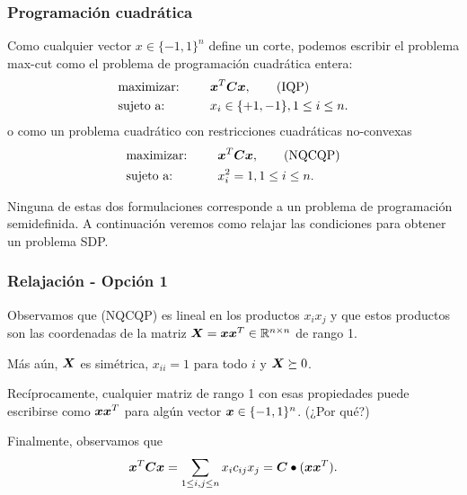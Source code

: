 \documentclass[aspectratio=169,12pt,spanish]{beamer}
\begin{document}

\begin{frame}
\frametitle{Programación cuadrática}

Como cualquier vector $x \in \{-1, 1\}^n$ define un corte, podemos escribir el problema max-cut como el problema de programación cuadrática entera:
\begin{alignat*}{2}
  & \text{maximizar: } & \quad & \bm{x}^T \bm{C} \bm{x}, \tag{IQP}\label{IQP} \\
  & \text{sujeto a: } & \quad & x_i \in \{+1, -1\}, 1 \le i \le n.
\end{alignat*}
o como un problema cuadrático con restricciones cuadráticas no-convexas
\begin{alignat*}{2}
  & \text{maximizar: } & \quad & \bm{x}^T \bm{C} \bm{x}, \tag{NQCQP}\label{NQCQP}\\
  & \text{sujeto a: } & \quad & x_i^2 = 1, 1 \le i \le n.
\end{alignat*}

Ninguna de estas dos formulaciones corresponde a un problema de programación semidefinida. A continuación veremos como relajar las condiciones para obtener un problema SDP.


\end{frame}


\begin{frame}
\frametitle{Relajación - Opción 1}

Observamos que (NQCQP) es lineal en los productos $x_i x_j$ y que estos productos son las coordenadas de la matriz $\bm{X} = \bm{x}\bm{x}^T \in \mathbb{R}^{n \times n}$ de rango 1.

Más aún, $\bm{X}$ es simétrica, $x_{ii} = 1$ para todo $i$ y $\bm{X} \succeq 0$.

Recíprocamente, cualquier matriz de rango 1 con esas propiedades puede escribirse como $\bm{x}\bm{x}^T$ para algún vector $\bm{x} \in \{-1, 1\}^n$. (¿Por qué?)

Finalmente, observamos que
$$\bm{x}^T \bm{C} \bm{x} = \sum_{1 \le i, j \le n} x_i c_{ij} x_j = \bm{C} \bullet (\bm{x}\bm{x}^T).$$
\end{frame}

\end{document}

